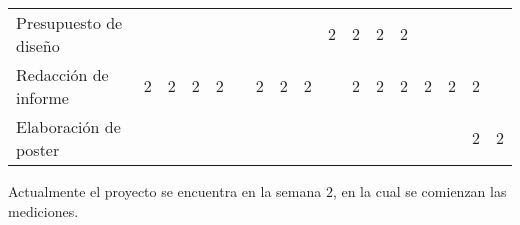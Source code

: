 \begin{table}[H]
{\begin{tabular}{|l|llllllllllllllll|}
Presupuesto de diseño &  &  &  &  &  &  &  &   & \cellcolor[HTML]{C0504D}$2$ & \cellcolor[HTML]{C0504D}$2$ & \cellcolor[HTML]{C0504D}$2$ & \multicolumn{1}{|l|}{\cellcolor[HTML]{C0504D}$2$} &  &  &  &  \\
Redacción de informe & \cellcolor[HTML]{9BBB59}$2$ & \cellcolor[HTML]{9BBB59}$2$ & {\cellcolor[HTML]{9BBB59}$2$} & {\cellcolor[HTML]{9BBB59}$2$} &  & \cellcolor[HTML]{9BBB59}$2$ & {\cellcolor[HTML]{9BBB59}$2$} & {\cellcolor[HTML]{9BBB59}$2$} &  & \cellcolor[HTML]{9BBB59}
$2$ & \cellcolor[HTML]{9BBB59}$2$ & \multicolumn{1}{|l|}{\cellcolor[HTML]{9BBB59}$2$} & {\cellcolor[HTML]{9BBB59}$2$} & \cellcolor[HTML]{9BBB59}$2$ & \cellcolor[HTML]{9BBB59}$2$ &  \\
Elaboración de poster &  &  &  &  &  &  &  &  &  &  &  & \multicolumn{1}{|l|}{} &  &  & \cellcolor[HTML]{538DD5}$2$ & \cellcolor[HTML]{538DD5}$2$ \\ \hline
\end{tabular}%
}
\end{table}
\noindent Actualmente el proyecto se encuentra en la semana $2$, en la cual se comienzan las mediciones.